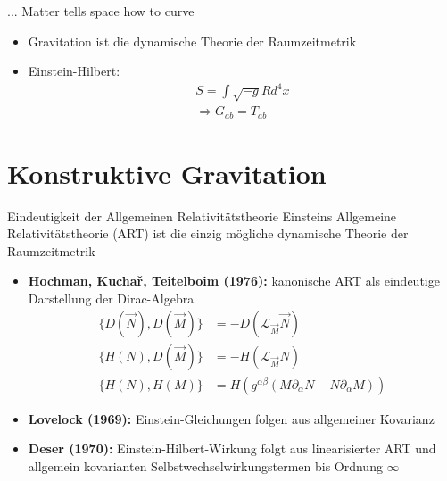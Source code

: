 \documentclass{beamer}
\begin{document}
    \begin{frame}{... Matter tells space how to curve}
        \begin{itemize}
            \item Gravitation ist die dynamische Theorie der Raumzeitmetrik \pause
            \item Einstein-Hilbert:
            \begin{gather*}
                S = \int \sqrt{-g} R d^4 x \\
                \Rightarrow G_{ab} = T_{ab}
            \end{gather*}
        \end{itemize}
    \end{frame}


    \section{Konstruktive Gravitation}\label{sec:constructive-gravity}

    \begin{frame}{Eindeutigkeit der Allgemeinen Relativitätstheorie}
        Einsteins Allgemeine Relativitätstheorie (ART) ist die einzig mögliche dynamische Theorie
        der Raumzeitmetrik \pause
        \begin{itemize}
            \setlength{\belowdisplayskip}{-10pt}
            \item \textbf{Hochman, Kuchař, Teitelboim (1976):} kanonische ART
            als eindeutige Darstellung der Dirac-Algebra
            \begin{align*}
                \{ D(\vec N), D(\vec M) \} &= -D(\mathcal L_{\vec M} \vec N) \\
                \{ H(N), D(\vec M) \} &= -H(\mathcal L_{\vec M} N) \\
                \{ H(N), H(M) \} &= H(g^{\alpha\beta}(M\partial_\alpha N - N\partial_\alpha M))
            \end{align*} \pause
            \item \textbf{Lovelock (1969):} Einstein-Gleichungen folgen aus allgemeiner Kovarianz \pause
            \item \textbf{Deser (1970):} Einstein-Hilbert-Wirkung folgt aus linearisierter ART und allgemein kovarianten
            Selbstwechselwirkungstermen bis Ordnung $\infty$
        \end{itemize}
    \end{frame}
\end{document}

